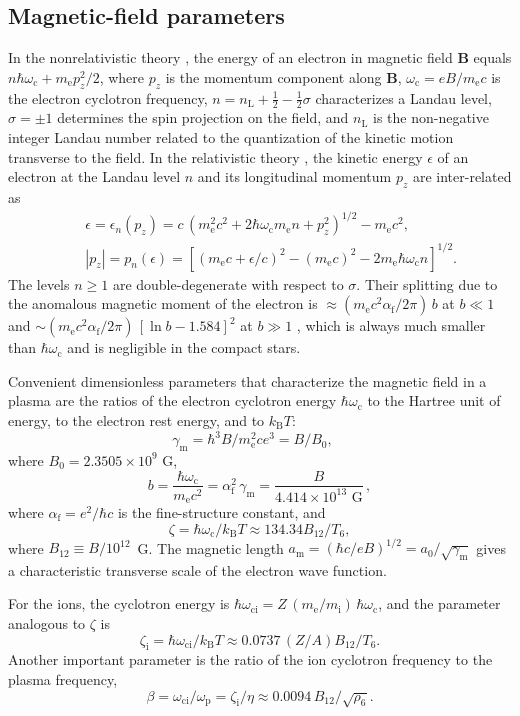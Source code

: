 \documentclass[traditabstract]{aa}
\newcommand{\beq}{\begin{equation}}
\newcommand{\eeq}{\end{equation}}
\newcommand{\bea}{\begin{eqnarray}}
\newcommand{\eea}{\end{eqnarray}}
\newcommand{\alphaf}{\alpha_\mathrm{f}}
\newcommand{\am}{a_\mathrm{m}}
\newcommand{\gammam}{\gamma_\mathrm{m}}
\newcommand{\mel}{m_\mathrm{e}}
\newcommand{\mion}{m_\mathrm{i}}
\newcommand{\kB}{k_\mathrm{B}}
\newcommand{\omp}{\omega_\mathrm{p}}
\newcommand{\omc}{\omega_\mathrm{c}}
\newcommand{\omci}{\omega_\mathrm{ci}}
\newcommand{\zeti}{\zeta_\mathrm{i}}
\begin{document}
\subsection{Magnetic-field parameters}
\label{sect:mag-par}

In the nonrelativistic theory \citep{LaLi-QM}, the energy of
an electron in magnetic field $\bm{B}$ equals $n\hbar\omc+\mel
p_z^2/2$, where $p_z$ is the momentum component along
$\bm{B}$, $\omc=eB/\mel c$ is the electron cyclotron
frequency, $n=n_\mathrm{L}+\frac12-\frac12\sigma$
characterizes a Landau level, $\sigma=\pm1$ determines
the spin projection on the field, and $n_\mathrm{L}$ is the
non-negative integer Landau number related to the
quantization of the kinetic motion transverse to the field.
In  the relativistic theory
\citep{JohnsonLippmann,LaLi-QED}, the kinetic energy
$\epsilon$ of an electron
at the Landau level $n$ and its longitudinal momentum $p_z$
are inter-related as
\bea
&&
   \epsilon = \epsilon_n(p_z) = c\,\left(\mel^2 c^2 + 2\hbar\omc
   \mel n+p_z^2\right)^{1/2} - \mel c^2,
\label{magnenergy}
\\&&
   |p_z| = p_n(\epsilon) = \left[
              (\mel c + \epsilon/c)^2 - (\mel c)^2
                      - 2 \mel \hbar \omc n  \right]^{1/2}.
\label{magnmoment}
\eea
The levels $n\geqslant 1$ are double-degenerate with respect
to $\sigma$. Their splitting due to the anomalous magnetic
moment of the electron is $\approx(\mel c^2
\alphaf/2\pi)\,b$ at $b\ll1$ and $\sim(\mel
c^2\alphaf/2\pi)\,[\ln b-1.584]^2$ at $b\gg1$
\citep[see][]{Schwinger88,SuhMathews}, which is
always much smaller than $\hbar\omc$ and is negligible in
the compact stars.

Convenient dimensionless parameters that characterize the
magnetic field in a plasma are the ratios of
the electron cyclotron energy
$\hbar\omc$ to the Hartree unit of energy, to the electron
rest energy, and to $\kB T$:
\beq
   \gammam=\hbar^3 B / \mel^2 c e^3 =
         B/B_0,
\quad
\eeq
where $B_0=2.3505\times10^9\mbox{~G}$,
\beq
   b=\frac{\hbar\omc}{\mel c^2}
       =\alphaf^2\, \gammam =
           \frac{B}{4.414\times10^{13}\mbox{~G}}\,,
\eeq
where $\alphaf=e^2/\hbar c$ is the fine-structure constant,
and
\beq
   \zeta = \hbar\omc/\kB T \approx 134.34 B_{12}/T_6,
\eeq
where
$B_{12}\equiv B/10^{12}$~G.
The magnetic length 
  $\am=(\hbar c/eB)^{1/2}=a_0/\sqrt{\gammam}$  gives a
characteristic transverse scale of the electron wave
function. 

For the ions, the cyclotron energy is $\hbar\omci =
Z\,(\mel/\mion)\, \hbar\omc$, and the parameter analogous to
$\zeta$ is
\beq
   \zeti = \hbar\omci/\kB T \approx 0.0737\,(Z/A)
           B_{12}/T_6.
\label{omci}
\eeq
Another important parameter is the ratio of the ion
cyclotron frequency to the plasma frequency,
\beq
   \beta = \omci/\omp = \zeti/\eta
          \approx 0.0094\,B_{12}/\sqrt{\rho_6}.
\eeq
\end{document}
